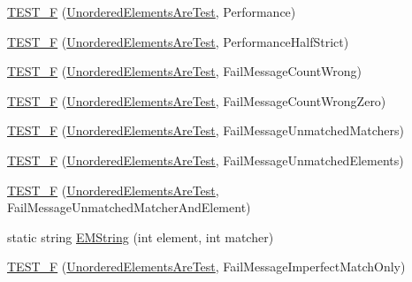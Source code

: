 \begin{DoxyCompactItemize}
\item 
\hyperlink{namespacetesting_1_1gmock__matchers__test_a074ca2babea203d1a54d69ff1fde5c59}{T\+E\+S\+T\+\_\+F} (\hyperlink{classtesting_1_1gmock__matchers__test_1_1UnorderedElementsAreTest}{Unordered\+Elements\+Are\+Test}, Performance)
\item 
\hyperlink{namespacetesting_1_1gmock__matchers__test_a4437de9d40efd87f73b738ef38c2d70f}{T\+E\+S\+T\+\_\+F} (\hyperlink{classtesting_1_1gmock__matchers__test_1_1UnorderedElementsAreTest}{Unordered\+Elements\+Are\+Test}, Performance\+Half\+Strict)
\item 
\hyperlink{namespacetesting_1_1gmock__matchers__test_a5dd3b28b540c1ef01e623f840c48e7b4}{T\+E\+S\+T\+\_\+F} (\hyperlink{classtesting_1_1gmock__matchers__test_1_1UnorderedElementsAreTest}{Unordered\+Elements\+Are\+Test}, Fail\+Message\+Count\+Wrong)
\item 
\hyperlink{namespacetesting_1_1gmock__matchers__test_a7dc8c467fe0d6f26c0ee643be56eb590}{T\+E\+S\+T\+\_\+F} (\hyperlink{classtesting_1_1gmock__matchers__test_1_1UnorderedElementsAreTest}{Unordered\+Elements\+Are\+Test}, Fail\+Message\+Count\+Wrong\+Zero)
\item 
\hyperlink{namespacetesting_1_1gmock__matchers__test_a11b785087491ae58b074fa8dbbc88cd4}{T\+E\+S\+T\+\_\+F} (\hyperlink{classtesting_1_1gmock__matchers__test_1_1UnorderedElementsAreTest}{Unordered\+Elements\+Are\+Test}, Fail\+Message\+Unmatched\+Matchers)
\item 
\hyperlink{namespacetesting_1_1gmock__matchers__test_a6dfb50dcbb543de71fcc4d09844d36b3}{T\+E\+S\+T\+\_\+F} (\hyperlink{classtesting_1_1gmock__matchers__test_1_1UnorderedElementsAreTest}{Unordered\+Elements\+Are\+Test}, Fail\+Message\+Unmatched\+Elements)
\item 
\hyperlink{namespacetesting_1_1gmock__matchers__test_a2395b7e71b7ad50af72caa61c10e6898}{T\+E\+S\+T\+\_\+F} (\hyperlink{classtesting_1_1gmock__matchers__test_1_1UnorderedElementsAreTest}{Unordered\+Elements\+Are\+Test}, Fail\+Message\+Unmatched\+Matcher\+And\+Element)
\item 
static string \hyperlink{namespacetesting_1_1gmock__matchers__test_a5ec14aa1e31cb496e5366f583e29dfeb}{E\+M\+String} (int element, int matcher)
\item 
\hyperlink{namespacetesting_1_1gmock__matchers__test_ac70f9f9717f35352349b076654094f6a}{T\+E\+S\+T\+\_\+F} (\hyperlink{classtesting_1_1gmock__matchers__test_1_1UnorderedElementsAreTest}{Unordered\+Elements\+Are\+Test}, Fail\+Message\+Imperfect\+Match\+Only)
\item 

\end{DoxyCompactItemize}

